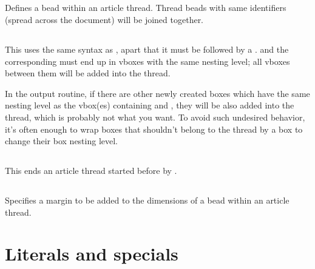 \documentclass{pdftexmanual}
\begin{document}
\subsection{}

Defines a bead within an article thread. Thread beads with same
identifiers (spread across the document) will be joined together.

\subsection{}

This uses the same syntax as , apart that it must be
followed by a .   and the
corresponding  must end up in vboxes with the same
nesting level; all vboxes between them will be added into the thread.

In the output routine, if there are other newly created boxes which have
the same nesting level as the vbox(es) containing 
and , they will be also added into the thread, which is
probably not what you want. To avoid such undesired behavior, it's often
enough to wrap boxes that shouldn't belong to the thread by a box to
change their box nesting level.

\subsection{}

This ends an article thread started before by .

\subsection{}

Specifies a margin to be added to the dimensions of a bead within
an article thread.

\section{Literals and specials}
\end{document}
